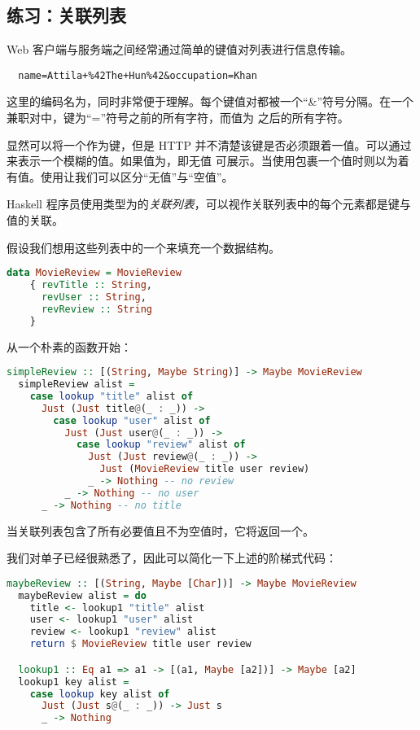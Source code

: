 \documentclass[./main.tex]{subfiles}
\begin{document}
\subsection*{练习：关联列表}

Web 客户端与服务端之间经常通过简单的键值对列表进行信息传输。

\begin{lstlisting}
  name=Attila+%42The+Hun%42&occupation=Khan
\end{lstlisting}

这里的编码名为，同时非常便于理解。每个键值对都被一个“\&”符号分隔。在一个兼职对中，键为“=”符号之前的所有字符，而值为
之后的所有字符。

显然可以将一个作为键，但是 HTTP 并不清楚该键是否必须跟着一值。可以通过来表示一个模糊的值。如果值为，即无值
可展示。当使用包裹一个值时则以为着有值。使用让我们可以区分“无值”与“空值”。

Haskell 程序员使用类型为\acode{[(a, b)]}的\textit{关联列表}，可以视作关联列表中的每个元素都是键与值的关联。

假设我们想用这些列表中的一个来填充一个数据结构。

\begin{lstlisting}[language=Haskell]
  data MovieReview = MovieReview
    { revTitle :: String,
      revUser :: String,
      revReview :: String
    }
\end{lstlisting}

从一个朴素的函数开始：

\begin{lstlisting}[language=Haskell]
  simpleReview :: [(String, Maybe String)] -> Maybe MovieReview
  simpleReview alist =
    case lookup "title" alist of
      Just (Just title@(_ : _)) ->
        case lookup "user" alist of
          Just (Just user@(_ : _)) ->
            case lookup "review" alist of
              Just (Just review@(_ : _)) ->
                Just (MovieReview title user review)
              _ -> Nothing -- no review
          _ -> Nothing -- no user
      _ -> Nothing -- no title
\end{lstlisting}

当关联列表包含了所有必要值且不为空值时，它将返回一个。

我们对单子已经很熟悉了，因此可以简化一下上述的阶梯式代码：

\begin{lstlisting}[language=Haskell]
  maybeReview :: [(String, Maybe [Char])] -> Maybe MovieReview
  maybeReview alist = do
    title <- lookup1 "title" alist
    user <- lookup1 "user" alist
    review <- lookup1 "review" alist
    return $ MovieReview title user review

  lookup1 :: Eq a1 => a1 -> [(a1, Maybe [a2])] -> Maybe [a2]
  lookup1 key alist =
    case lookup key alist of
      Just (Just s@(_ : _)) -> Just s
      _ -> Nothing
\end{lstlisting}
\end{document}
